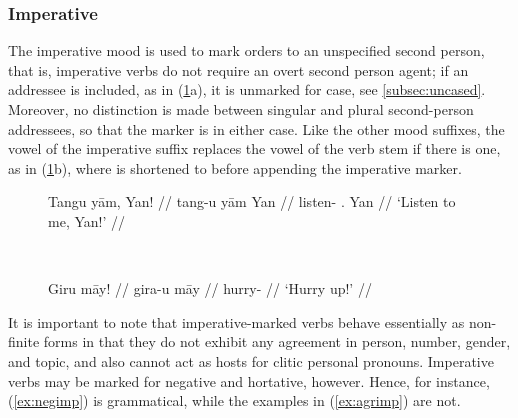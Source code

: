 
\subsubsection{Imperative}

The imperative mood is used to mark orders to an unspecified second person,
that is, imperative verbs do not require an overt second person agent; if an
addressee is included, as in (\ref{ex:impmorph}a), it is unmarked for case,
see \autoref{subsec:uncased}. Moreover, no distinction is made between singular
and plural second-person addressees, so that the marker is  in
either case. Like the other mood suffixes, the vowel of the imperative suffix
replaces the vowel of the verb stem if there is one, as in
(\ref{ex:impmorph}b), where  is shortened to
 before appending the imperative marker.

\begin{figure}[h]
\ex{}\label{ex:impmorph}
\begin{minipage}[t]{.5\remaining}
\tl\quad\begingl
	\gla Tangu yām, Yan! //
	\glb tang-u yām Yan //
	\glc listen-\Imp{} \Fsg{}.\Dat{} Yan //
	\glft `Listen to me, Yan!' //
\endgl
\end{minipage}
~
\begin{minipage}[t]{.5\remaining}
\tl\quad\begingl
	\gla Giru māy! //
	\glb gira-u māy //
	\glc hurry-\Imp{} \Int{} //
	\glft `Hurry up!' //
\endgl
\end{minipage}

\xe
\end{figure}

It is important to note that imperative-marked verbs behave essentially as
non-finite forms in that they do not exhibit any agreement in person, number,
gender, and topic, and also cannot act as hosts for clitic personal pronouns.
Imperative verbs may be marked for negative and hortative, however. Hence, for
instance, (\ref{ex:negimp}) is grammatical, while the examples in
(\ref{ex:agrimp}) are not.

